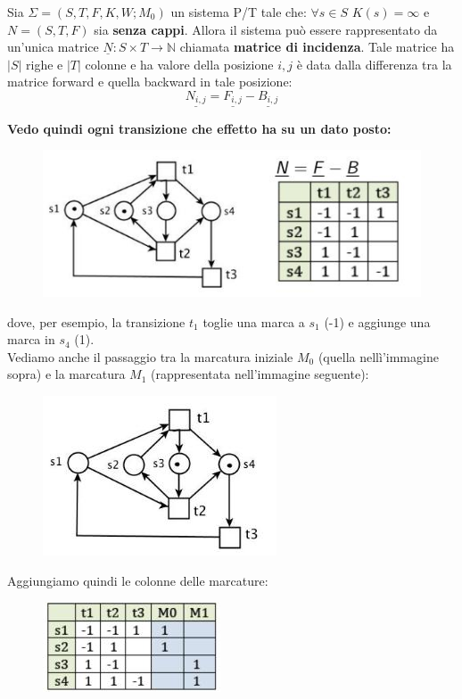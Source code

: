 \documentclass[a4paper,12pt, oneside]{book}
\begin{document}
\begin{definizione}
  Sia $\Sigma = (S, T , F , K , W ; M_0 )$ un sistema P/T tale che: $\forall s
  \in S\,\, K (s) = \infty$ e $N= (S, T , F)$ sia \textbf{senza cappi}. Allora
  il sistema può essere rappresentato da un’unica matrice $\underline{N} : S
  \times T \to\mathbb{N}$ chiamata \textbf{matrice di incidenza}. Tale matrice
  ha $|S|$ righe e $|T|$ colonne e ha valore della posizione $i,j$ è data dalla
  differenza tra la matrice forward e quella backward in tale posizione:
  \[\underline{N_{i,j}}=\underline{F_{i,j}}-\underline{B_{i,j}}\]
  \begin{esempio}
    \textbf{Vedo quindi ogni transizione che effetto ha su un dato posto:}
    \begin{figure}[H]
      \centering
      \includegraphics[scale = 0.6]{img/al3.jpg}
    \end{figure}
    dove, per esempio, la transizione $t_1$ toglie una marca a $s_1$ (-1) e
    aggiunge una marca in $s_4$ (1).\\
    Vediamo anche il passaggio tra la marcatura iniziale $M_0$ (quella
    nellì'immagine sopra) e la marcatura $M_1$ (rappresentata nell'immagine
    seguente):
    \begin{figure}[H]
      \centering
      \includegraphics[scale = 0.6]{img/al4.jpg}
    \end{figure}
    Aggiungiamo quindi le colonne delle marcature:
    \begin{figure}[H]
      \centering
      \includegraphics[scale = 0.6]{img/al5.jpg}

\end{figure}
\end{esempio}
\end{definizione}
\end{document}
